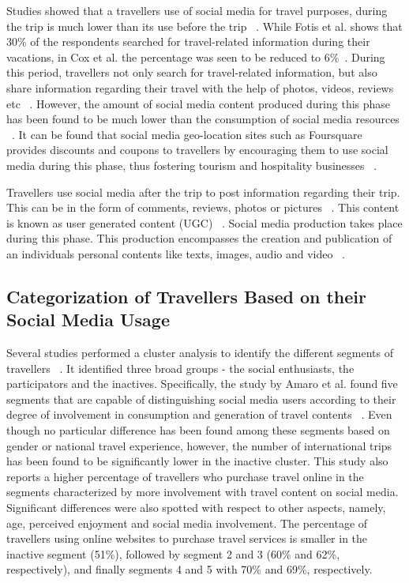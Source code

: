 Studies showed that a traveller\textquotesingle s use of social media for travel purposes, during the trip is much lower than its use before the trip ~\cite{cox2009role, fotis2012social}. While Fotis et al. shows that 30\% of the respondents searched for travel-related information during their vacations, in Cox et al. the percentage was seen to be reduced to 6\%~\cite{fotis2012social, cox2009role}. During this period, travellers not only search for travel-related information, but also share information regarding their travel with the help of photos, videos, reviews etc ~\cite{amaro2016travelers}. However, the amount of social media content produced during this phase has been found to be much lower than the consumption of social media resources ~\cite{fotis2012social}. It can be found that social media geo-location sites such as Foursquare provides discounts and coupons to travellers by encouraging them to use social media during this phase, thus fostering tourism and hospitality businesses ~\cite{hudson2013impact}.

Travellers use social media after the trip to post information regarding their trip. This can be in the form of comments, reviews, photos or pictures ~\cite{fotis2012social, parra2012travellers}. This content is known as user generated content (UGC) ~\cite{simms2012online}. Social media production takes place during this phase. This production encompasses the creation and publication of an individual\textquotesingle s personal contents like texts, images, audio and video ~\cite{shao2009understanding}. 


\subsection{Categorization of Travellers Based on their Social Media Usage}\label{2.3}

Several studies performed a cluster analysis to identify the different segments of travellers~\cite{chiu2012china, foster2011exploring, kurtulucs2015social} . It identified three broad groups - the social enthusiasts, the participators and the inactives. Specifically, the study by Amaro et al. found five segments that are capable of distinguishing social media users according to their degree of involvement in consumption and generation of travel contents ~\cite{amaro2016travelers}. Even though no particular difference has been found among these segments based on gender or national travel experience, however, the number of international trips has been found to be significantly lower in the inactive cluster. This study also reports a higher percentage of travellers who purchase travel online in the segments characterized by more involvement with travel content on social media. Significant differences were also spotted with respect to other aspects, namely, age, perceived enjoyment and social media involvement. 	The percentage of travellers using online websites to purchase travel services is smaller in the inactive segment (51\%), followed by segment 2 and 3 (60\% and 62\%, respectively), and finally segments 4 and 5 with 70\% and 69\%, respectively.

